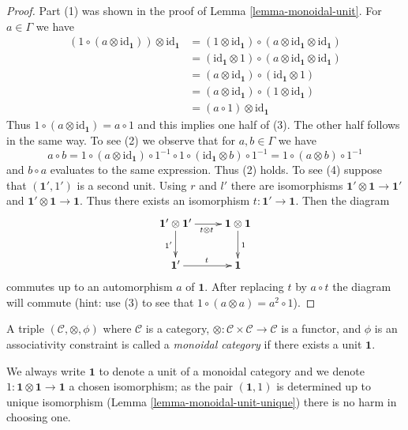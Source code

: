 \begin{proof}
Part (1) was shown in the proof of Lemma \ref{lemma-monoidal-unit}.
For $a \in \Gamma$ we have
\begin{align*}
(1 \circ (a \otimes \text{id}_\mathbf{1})) \otimes \text{id}_\mathbf{1}
& =
(1 \otimes \text{id}_\mathbf{1}) \circ
(a \otimes \text{id}_\mathbf{1} \otimes \text{id}_\mathbf{1}) \\
& =
(\text{id}_\mathbf{1} \otimes 1) \circ
(a \otimes \text{id}_\mathbf{1} \otimes \text{id}_\mathbf{1}) \\
& =
(a \otimes \text{id}_\mathbf{1}) \circ
(\text{id}_\mathbf{1} \otimes 1) \\
& =
(a \otimes \text{id}_\mathbf{1}) \circ
(1 \otimes \text{id}_\mathbf{1}) \\
& =
(a \circ 1) \otimes \text{id}_\mathbf{1}
\end{align*}
Thus $1 \circ (a \otimes \text{id}_\mathbf{1}) = a \circ 1$
and this implies one half of (3). The other half follows in
the same way. To see (2) we observe that for $a, b \in \Gamma$
we have
$$
a \circ b =
1 \circ (a \otimes \text{id}_\mathbf{1}) \circ 1^{-1}
\circ
1 \circ (\text{id}_\mathbf{1} \otimes b) \circ 1^{-1}
=
1 \circ (a \otimes b) \circ 1^{-1}
$$
and $b \circ a$ evaluates to the same expression. Thus (2) holds.
To see (4) suppose that $(\mathbf{1}', 1')$ is a second unit.
Using $r$ and $l'$ there are isomorphisms
$\mathbf{1}' \otimes \mathbf{1} \to \mathbf{1}'$ and
$\mathbf{1}' \otimes \mathbf{1} \to \mathbf{1}$. Thus
there exists an isomorphism $t : \mathbf{1}' \to \mathbf{1}$.
Then the diagram
$$
\xymatrix{
\mathbf{1}' \otimes \mathbf{1}' \ar[r]_{t \otimes t} \ar[d]_{1'} & 
\mathbf{1} \otimes \mathbf{1} \ar[d]^1 \\
\mathbf{1}' \ar[r]^t & \mathbf{1}
}
$$
commutes up to an automorphism $a$ of $\mathbf{1}$. After replacing
$t$ by $a \circ t$ the diagram will commute (hint: use (3) to see
that $1 \circ (a \otimes a) = a^2 \circ 1$).
\end{proof}

\begin{definition}
\label{definition-monoidal-category}
A triple $(\mathcal{C}, \otimes, \phi)$ where $\mathcal{C}$ is a category,
$\otimes : \mathcal{C} \times \mathcal{C} \to \mathcal{C}$ is a functor,
and $\phi$ is an associativity constraint is called a {\it monoidal category}
if there exists a unit $\mathbf{1}$.
\end{definition}

\noindent
We always write $\mathbf{1}$ to denote a unit of a monoidal category
and we denote $1 : \mathbf{1} \otimes \mathbf{1} \to \mathbf{1}$
a chosen isomorphism; as the pair $(\mathbf{1}, 1)$ is determined
up to unique isomorphism (Lemma \ref{lemma-monoidal-unit-unique})
there is no harm in choosing one.

